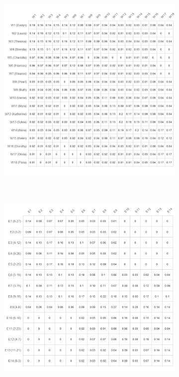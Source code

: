 \documentclass[a4paper,fleqn]{cas-sc}
\begin{document}
\begin{figure}[ht!]
    \captionsetup[subfigure]{font=footnotesize,labelfont=footnotesize}
    \centering
     \begin{subfigure}[b]{0.55\textwidth}
        \includegraphics[width=1.0\textwidth]{Plots/p-norm.png}
    \end{subfigure} \\
     \begin{subfigure}[b]{0.55\textwidth}
        \includegraphics[width=1.0\textwidth]{Plots/g-norm.png}

\end{subfigure}
\end{figure}
\end{document}
